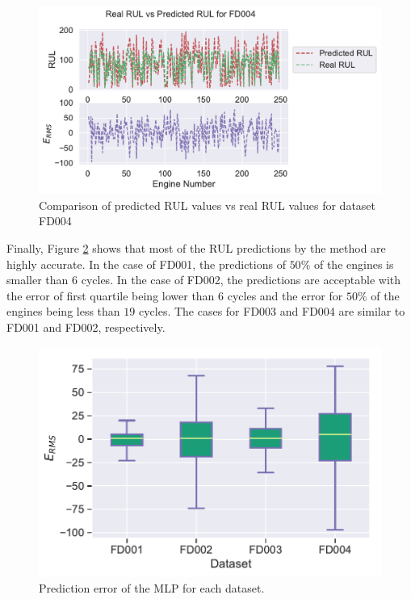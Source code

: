 \documentclass[preprint,12pt]{elsarticle}%
\begin{document}
\begin{figure}[H]
\begin{center}
\includegraphics[scale=0.7]{Figures/rul_plots_dataset_4.pdf}
\caption{Comparison of predicted RUL values vs real RUL values for dataset FD004}
\label{Fig:rul_plots_dataset_4}
\end{center}
\end{figure}

\pagebreak

Finally, Figure \ref{Fig:rul_plots_boxplot} shows that most of the RUL predictions by the method are highly accurate. In the case of FD001, the predictions of $50\%$ of the engines is smaller than $6$ cycles. In the case of FD002, the predictions are acceptable with the error of first quartile being lower than $6$ cycles and the error for $50\%$ of the engines being less than $19$ cycles. The cases for FD003 and FD004 are similar to FD001 and FD002, respectively.

\begin{figure}[H]
\begin{center}
\includegraphics[scale=0.6]{Figures/error_stats_boxplot.pdf}
\caption{Prediction error of the MLP for each dataset.}
\label{Fig:rul_plots_boxplot}
\end{center}
\end{figure}
\end{document}
